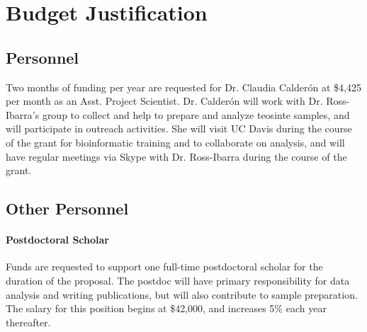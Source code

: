 \documentclass[11pt,letterpaper]{article}
\newcommand{\required}[1]{\section*{\hfil #1\hfil}}                    %
\begin{document}
\setcounter{page}{1}

\required{Budget Justification}

\subsection*{Personnel}

Two months of funding per year are requested for Dr. Claudia Calder\'{o}n at \$4,425 per month as an Asst. Project Scientist. Dr. Calder\'{o}n will work with Dr. Ross-Ibarra's group to collect and help to prepare and analyze teosinte samples, and will participate in outreach activities.  She will visit UC Davis during the course of the grant for bioinformatic training and to collaborate on analysis, and will have regular meetings via Skype with Dr. Ross-Ibarra during the course of the grant.

\subsection*{Other Personnel}
\paragraph{Postdoctoral Scholar}
Funds are requested to support one full-time postdoctoral scholar for the duration of the proposal. The postdoc will have primary responsibility for data analysis and writing publications, but will also contribute to sample preparation. The salary for this position begins at \$42,000, and increases 5\% each year thereafter.


\end{document}
